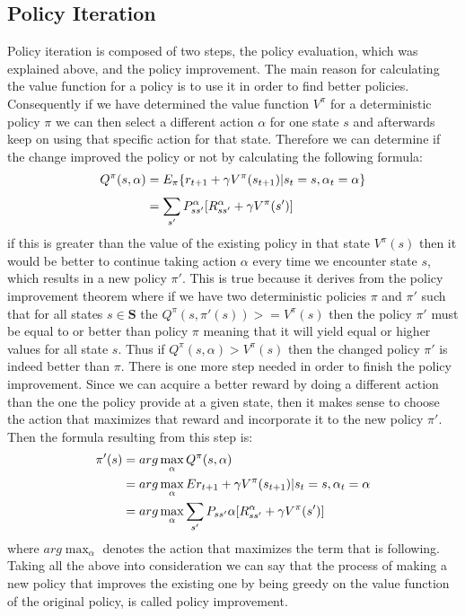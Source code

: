 \documentclass[paper=a4, fontsize=11pt]{scrartcl}
\numberwithin{equation}{section}		%
\numberwithin{figure}{section}			%
\numberwithin{table}{section}				%
\begin{document}
\subsection{Policy Iteration}
\label{PIter}
Policy iteration is composed of two steps, the policy evaluation, which was explained above, and the policy improvement. The main reason for calculating the value function for a policy is to use it in order to find better policies. Consequently if we have determined the value function $V^{\pi}$ for a deterministic policy $\pi$ we can then select a different action $\alpha$ for one state $s$ and afterwards keep on using that specific action for that state. Therefore we can determine if the change improved the policy or not by calculating the following formula:
\begin{align}
Q^\pi(s,\alpha) & = E_\pi \{r_{t+1} + \gamma V^{\pi} (s_{t+1})| s_t = s, \alpha_t = \alpha\}\notag\\
& = \sum_{s'}^{}P_{ss'}^{\alpha}[R_{ss'}^{\alpha}+\gamma V^\pi(s')]
\end{align}
if this is greater than the value of the existing policy in that state $V^\pi(s)$ then it would be better to continue taking action $\alpha$ every time we encounter state $s$, which results in a new policy $\pi'$. This is true because it derives from the policy improvement theorem where if we have two deterministic policies $\pi$ and $\pi'$ such that for all states $s \in \mathbf{S}$ the $Q^\pi(s,\pi'(s)) >= V^\pi(s)$ then the policy $\pi'$ must be equal to or better than policy $\pi$ meaning that it will yield equal or higher values for all state $s$. Thus if $Q^\pi(s,\alpha) > V^\pi(s)$ then the changed policy $\pi'$ is indeed better than $\pi$. There is one more step needed in order to finish the policy improvement. Since we can acquire a better reward by doing a different action than the one the policy provide at a given state, then it makes sense to choose the action that maximizes that reward and incorporate it to the new policy $\pi'$. Then the formula resulting from this step is:
\begin{align}
\pi'(s) &= arg\max_\alpha Q^\pi(s,\alpha)\notag\\
&= arg\max_\alpha E{r_{t+1} + \gamma V^\pi(s_{t+1})|s_t=s,\alpha_t=\alpha}\notag\\
&= arg\max_\alpha \sum_{s'}P_{ss'}{\alpha}[R_{ss'}^{\alpha} + \gamma V^\pi(s')]
\end{align}
where $arg\max_\alpha$ denotes the action that maximizes the term that is following. Taking all the above into consideration we can say that the process of making a new policy that improves the existing one by being greedy on the value function of the original policy, is called policy improvement.
\end{document}
